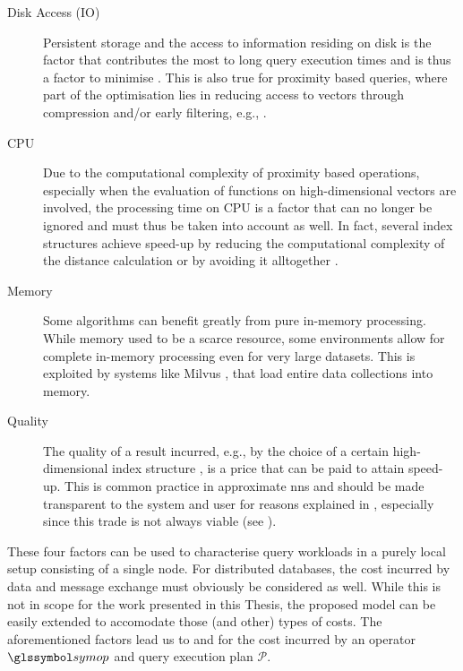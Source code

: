 \begin{description}
    \item[Disk Access (IO)] Persistent storage and the access to information residing on disk is the factor that contributes the most to long query execution times and is thus a factor to minimise \cite{Selinger:1979Access}. This is also true for proximity based queries, where part of the optimisation lies in reducing access to vectors through compression and/or early filtering, e.g., \cite{Weber:1998Va, Chierichetti:2007Finding}.
    \item[CPU] Due to the computational complexity of proximity based operations, especially when the evaluation of functions on high-dimensional vectors are involved, the processing time on CPU is a factor that can no longer be ignored and must thus be taken into account as well. In fact, several index structures achieve speed-up by reducing the computational complexity of the distance calculation \cite{Jegou:2010Product} or by avoiding it alltogether \cite{Weber:1998Va}.
    \item[Memory] Some algorithms can benefit greatly from pure in-memory processing. While memory used to be a scarce resource, some environments allow for complete in-memory processing even for very large datasets. This is exploited by systems like Milvus \cite{Wang:2021Milvus}, that load entire data collections into memory.
    \item[Quality] The quality of a result incurred, e.g., by the choice of a certain high-dimensional index structure \cite{Indyk1998:Approximate,Jegou:2010Product}, is a price that can be paid to attain speed-up. This is common practice in approximate \acrshort{nns} and should be made transparent to the system and user for reasons explained in , especially since this trade is not always viable (see ).
\end{description}

These four factors can be used to characterise query workloads in a purely local setup consisting of a single node. For distributed databases, the cost incurred by data and message exchange must obviously be considered as well. While this is not in scope for the work presented in this Thesis, the proposed model can be easily extended to accomodate those (and other) types of costs. The aforementioned factors lead us to  and  for the cost incurred by an operator $\symop$ and query execution plan $\mathcal{P}$.

